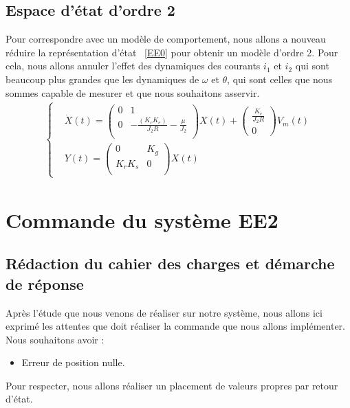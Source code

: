 \subsection{Espace d'état d'ordre 2}
Pour correspondre avec un modèle de comportement, nous allons a nouveau réduire la représentation d'état ~\eqref{EE0} pour obtenir un modèle d'ordre 2. Pour cela, nous allons annuler l'effet des dynamiques des courants $i_1$ et $i_2$ qui sont beaucoup plus grandes que les dynamiques de $\omega$ et $\theta$, qui sont celles que nous sommes capable de mesurer et que nous souhaitons asservir.\\

\begin{align}
\label{EE2}
\left\lbrace
\begin{aligned}
&\dot{X}(t) 
=
 \begin{pmatrix}
0 &	1 \\
0	&	-\frac{(K_cK_e)}{J_2R}-\frac{\mu}{J_2}\\
\end{pmatrix}X(t)
+
\begin{pmatrix}
\frac{K_c}{J_2R}\\
0
\end{pmatrix} 
V_m(t)\\
&Y(t) = \begin{pmatrix}
0	&	K_g	\\
K_rK_s	&	0	\\
\end{pmatrix}X(t)
\end{aligned}
\right.
\end{align}

\section{Commande du système EE2}
\subsection{Rédaction du cahier des charges et démarche de réponse}
Après l'étude que nous venons de réaliser sur notre système, nous allons ici exprimé les attentes que doit réaliser la commande que nous allons implémenter. Nous souhaitons avoir : \begin{itemize} 
\item Erreur de position nulle.
\end{itemize}
Pour respecter, nous allons réaliser un placement de valeurs propres par retour d'état.
